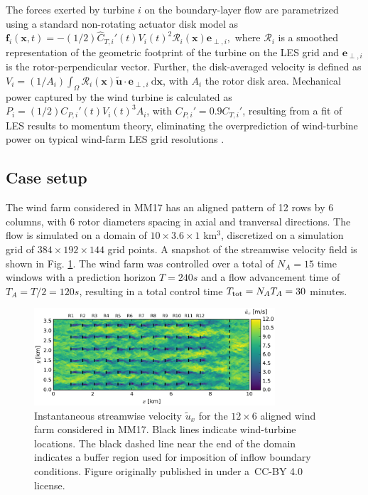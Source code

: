 \documentclass[wes, manuscript]{copernicus}
\begin{document}
The forces exerted by turbine $i$ on the boundary-layer flow are parametrized using a standard non-rotating actuator disk model as
$	\boldsymbol{f}_i(\boldsymbol{x},t) = - (1/2) \widehat{C}_{T,i}'(t) V_i(t)^2 \mathscr{R}_i (\boldsymbol{x}) \boldsymbol{e}_{\perp,i},$
where $\mathscr{R}_i$ is a smoothed representation of the geometric footprint of the turbine on the LES grid and $\boldsymbol{e}_{\perp,i}$ is the rotor-perpendicular vector. Further, the disk-averaged velocity is defined as $V_i = (1/A_i) \int_{\Omega} \mathscr{R}_i(\boldsymbol{x}) \widetilde{\boldsymbol{u}} \cdot \boldsymbol{e}_{\perp,i} ~\text{d}\boldsymbol{x}$, with $A_i$ the rotor disk area. Mechanical power captured by the wind turbine is calculated as $P_i = (1/2) C_{P,i}'(t) V_i(t)^3 A_i$, with $C_{P,i}' = 0.9 C_{T,i}'$, resulting from a fit of LES results to momentum theory, eliminating the overprediction of wind-turbine power on typical wind-farm LES grid resolutions \citep{munters2017optimal}.  

\subsection{Case setup}
The wind farm considered in MM17 has an aligned pattern of 12 rows by 6 columns, with 6 rotor diameters spacing in axial and tranversal directions. The flow is simulated on a domain of $10 \times 3.6 \times 1$ km$^3$, discretized on a simulation grid of $384 \times 192 \times 144$ grid points. A snapshot of the streamwise velocity field is shown in Fig. \ref{fig:flowfield_MM17}. The wind farm was controlled over a total of $N_A = 15$ time windows with a prediction horizon $T = 240 s$ and a flow advancement time of $T_A = T/2 = 120 s$, resulting in a total control time $T_{\rm tot} = N_A T_A = 30$ minutes. 

\begin{figure}
	\includegraphics[width=0.8\textwidth]{figure2}
	\caption{Instantaneous streamwise velocity $\widetilde{u}_x$ for the $12 \times 6$ aligned wind farm considered in MM17. Black lines indicate wind-turbine locations. The black dashed line near the end of the domain indicates a buffer region used for imposition of inflow boundary conditions. Figure originally published in \cite{munters2017optimal} under a~CC-BY 4.0 license.\label{fig:flowfield_MM17}}
\end{figure}
\end{document}
